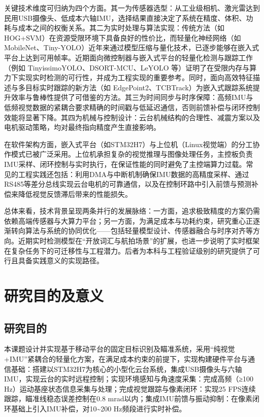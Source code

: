 关键技术维度可归纳为四个方面。其一为传感器选型：从工业级相机、激光雷达到民用USB摄像头、低成本六轴IMU，选择结果直接决定了系统在精度、体积、功耗与成本之间的权衡关系。其二为实时处理与算法实现：传统方法（如HOG+SVM）在资源受限环境下具备良好的性价比，而轻量化神经网络（如MobileNet、Tiny-YOLO）近年来通过模型压缩与量化技术，已逐步能够在嵌入式平台上达到可用帧率。近期面向微控制器与嵌入式平台的轻量化检测与跟踪工作（例如 TinyissimoYOLO、DSORT-MCU、LeYOLO 等）证明了在受限内存与算力下实现实时检测的可行性，并成为工程实现的重要参考\cite{moosmann2023tinyissimoyoloquantizedlowmemoryfootprint,boyle2024dsortmcudetectingsmallobjects,hollard2025leyolonewembeddedarchitecture}。同时，面向高效特征描述与多目标实时跟踪的新方法（如 EdgePoint2、TCBTrack）为嵌入式跟踪系统提升效率与鲁棒性提供了可借鉴的方法\cite{yao2025edgepoint2compactdescriptorssuperior,zhang2024temporalcorrelationmeetsembedding}。其三为时间同步与时序保障：高频IMU与低频视觉数据的紧耦合要求精确的时间戳与低延迟通信，否则前馈补偿与闭环控制效能将显著下降。其四为机械与控制设计：云台机械结构的合理性、减震方案以及电机驱动策略，均对最终指向精度产生直接影响。

在软件架构方面，嵌入式平台（如STM32H7）与上位机（Linux视觉端）的分工协作模式已被广泛采用。上位机承担复杂的视觉推理与图像处理任务，主控板负责IMU采样、闭环控制与实时执行，在保证性能的同时避免了主控端算力过载。常见的工程实践还包括：利用DMA与中断机制确保IMU数据的高精度采样、通过RS485等差分总线实现云台电机的可靠通信，以及在控制环路中引入前馈与预测补偿来降低视觉反馈滞后带来的性能损失。

总体来看，技术背景呈现两条并行的发展脉络：一方面，追求极致精度的方案仍需依赖高端传感器与大算力平台；另一方面，为满足成本与功耗约束，研究重心正逐渐转向算法与系统的协同优化——包括轻量模型设计、传感器融合与时序对齐等方向。近期实时检测模型在“开放词汇与航拍场景”的扩展，也进一步说明了实时框架在复杂任务下的可迁移性与工程潜力\cite{wang2025yoloerealtimeseeing,xiao2025fbrtyolofasterbetterrealtime}。后者为本科与工程验证级别的研究提供了可行且具备实践意义的实现路径。
\section{研究目的及意义}

\subsection{研究目的}
本课题设计并实现基于移动平台的固定目标识别及瞄准系统，采用``纯视觉+IMU''紧耦合的轻量化方案，在满足成本约束的前提下，实现构建硬件平台与通信基础：搭建以STM32H7为核心的小型化云台系统，集成USB摄像头与六轴IMU，实现云台的实时远程控制；实现环境感知与角速度采集：完成高频（≥100 Hz）运动基座状态信息采集与处理；完成视觉跟踪与像素闭环：实现25 FPS连续跟踪，瞄准线稳态误差控制在0.8 mrad以内；集成IMU前馈与振动抑制：在像素闭环基础上引入IMU补偿，对10\textasciitilde{}200 Hz频段进行实时补偿。

